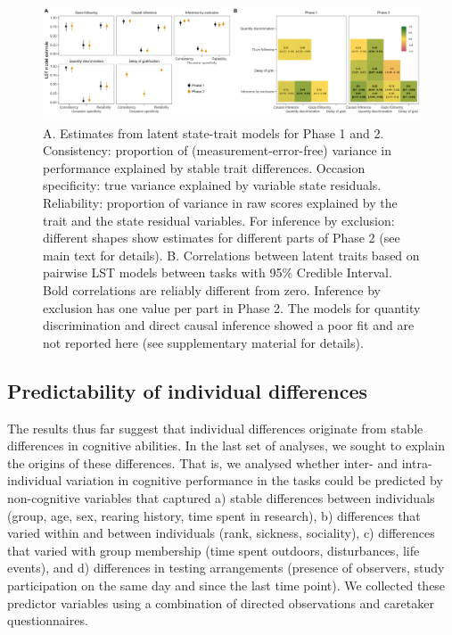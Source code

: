 \documentclass[
  man,floatsintext]{apa6}
\begin{document}
\begin{figure}
\includegraphics[width=1\linewidth]{./figures/lstm} \caption{A. Estimates from latent state-trait models for Phase 1 and 2. Consistency: proportion of (measurement-error-free) variance in performance explained by stable trait differences. Occasion specificity: true variance explained by variable state residuals. Reliability: proportion of variance in raw scores explained by the trait and the state residual variables. For inference by exclusion: different shapes show estimates for different parts of Phase 2 (see main text for details). B. Correlations between latent traits based on pairwise LST models between tasks with 95\% Credible Interval. Bold correlations are reliably different from zero. Inference by exclusion has one value per part in Phase 2. The models for quantity discrimination and direct causal inference showed a poor fit and are not reported here (see supplementary material for details).}\label{fig:lstmplot}
\end{figure}

\hypertarget{predictability-of-individual-differences}{%
\subsection{Predictability of individual differences}\label{predictability-of-individual-differences}}

The results thus far suggest that individual differences originate from stable differences in cognitive abilities. In the last set of analyses, we sought to explain the origins of these differences. That is, we analysed whether inter- and intra-individual variation in cognitive performance in the tasks could be predicted by non-cognitive variables that captured a) stable differences between individuals (group, age, sex, rearing history, time spent in research), b) differences that varied within and between individuals (rank, sickness, sociality), c) differences that varied with group membership (time spent outdoors, disturbances, life events), and d) differences in testing arrangements (presence of observers, study participation on the same day and since the last time point). We collected these predictor variables using a combination of directed observations and caretaker questionnaires.
\end{document}
